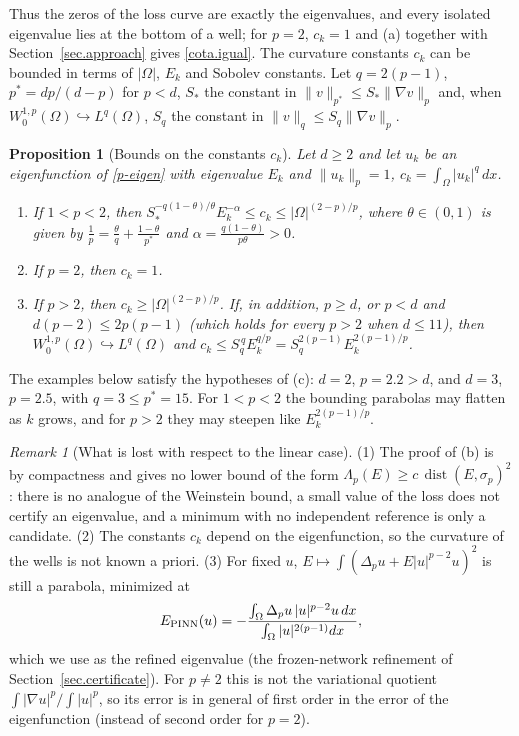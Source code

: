 \documentclass[10pt]{amsart}
\theoremstyle{definition}
\theoremstyle{remark}
\newtheorem{remark}{Remark}
\theoremstyle{plain}
\newtheorem{proposition}[theorem]{Proposition}
\DeclareMathOperator{\dist}{dist}
\begin{document}
Thus the zeros of the loss curve are exactly the eigenvalues, and every isolated eigenvalue lies at
the bottom of a well; for $p=2$, $c_k=1$ and (a) together with Section~\ref{sec.approach} gives
\eqref{cota.igual}. The curvature constants $c_k$ can be bounded in terms of $|\Omega|$, $E_k$ and Sobolev
constants. Let $q=2(p-1)$, $p^*=dp/(d-p)$ for $p<d$, $S_*$ the constant in $\|v\|_{p^*}\le S_*\|\nabla v\|_p$
and, when $W^{1,p}_0(\Omega)\hookrightarrow L^q(\Omega)$, $S_q$ the constant in $\|v\|_q\le S_q\|\nabla v\|_p$.

\begin{proposition}[Bounds on the constants $c_k$]\label{prop.ck}
Let $d\ge2$ and let $u_k$ be an eigenfunction of \eqref{p-eigen} with eigenvalue $E_k$ and
$\|u_k\|_p=1$, $c_k=\int_\Omega|u_k|^q\,dx$.
\begin{enumerate}
\item[(a)] If $1<p<2$, then $S_*^{-q(1-\theta)/\theta}E_k^{-\alpha}\le c_k\le|\Omega|^{(2-p)/p}$, where
$\theta\in(0,1)$ is given by $\frac1p=\frac\theta q+\frac{1-\theta}{p^*}$ and $\alpha=\frac{q(1-\theta)}{p\theta}>0$.
\item[(b)] If $p=2$, then $c_k=1$.
\item[(c)] If $p>2$, then $c_k\ge|\Omega|^{(2-p)/p}$. If, in addition, $p\ge d$, or $p<d$ and
$d(p-2)\le2p(p-1)$ (which holds for every $p>2$ when $d\le11$), then
$W^{1,p}_0(\Omega)\hookrightarrow L^q(\Omega)$ and $c_k\le S_q^{\,q}E_k^{q/p}=S_q^{2(p-1)}E_k^{2(p-1)/p}$.
\end{enumerate}
\end{proposition}

The examples below satisfy the hypotheses of (c): $d=2$, $p=2.2>d$, and $d=3$, $p=2.5$, with
$q=3\le p^*=15$. For $1<p<2$ the bounding parabolas may flatten as $k$ grows, and for $p>2$ they may
steepen like $E_k^{2(p-1)/p}$.

\begin{remark}[What is lost with respect to the linear case]\label{rem.plap.lost}
(1) The proof of (b) is by compactness and gives no lower bound of the form
$\Lambda_p(E)\ge c\,\dist(E,\sigma_p)^2$: there is no analogue of the Weinstein bound, a small value
of the loss does not certify an eigenvalue, and a minimum with no independent reference is only a
candidate. (2) The constants $c_k$ depend on the eigenfunction, so the curvature of the wells is not
known a priori. (3) For fixed $u$, $E\mapsto\int(\Delta_pu+E|u|^{p-2}u)^2$ is still a parabola,
minimized at
\[
E_{\rm PINN}(u)=-\frac{\int_\Omega\Delta_pu\,|u|^{p-2}u\,dx}{\int_\Omega|u|^{2(p-1)}dx},
\]
which we use as the refined eigenvalue (the frozen-network refinement of
Section~\ref{sec.certificate}). For $p\ne2$ this is not the variational quotient
$\int|\nabla u|^p/\int|u|^p$, so its error is in general of first order in the error of the
eigenfunction (instead of second order for $p=2$).
\end{remark}
\end{document}
